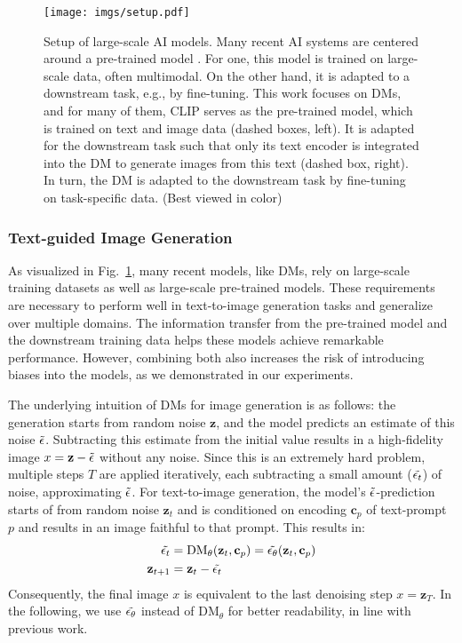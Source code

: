 \documentclass{article}%
\begin{document}
\begin{figure}[t]
    \centering
    \texttt{[image: imgs/setup.pdf]}
    \caption{Setup of large-scale AI models. Many recent AI systems are centered around a pre-trained model \cite{Bommasani21foundationmodels}. For one, this model is trained on large-scale data, often multimodal. On the other hand, it is adapted to a downstream task, e.g., by fine-tuning. This work focuses on DMs, and for many of them, CLIP serves as the pre-trained model, which is trained on text and image data (dashed boxes, left). It is adapted for the downstream task such that only its text encoder is integrated into the DM to generate images from this text (dashed box, right). In turn, the DM is adapted to the downstream task by fine-tuning on task-specific data. (Best viewed in color)}
    \label{fig:pipe}
\end{figure}

\subsubsection*{Text-guided Image Generation}\label{sec:diffusion}
As visualized in Fig.~\ref{fig:pipe}, 
many recent models, like DMs, rely on large-scale training datasets as well as large-scale pre-trained models. These requirements are necessary to perform well in text-to-image generation tasks and generalize over multiple domains. The information transfer from the pre-trained model and the downstream training data helps these models achieve remarkable performance. However, combining both also increases the risk of introducing biases into the models, as we demonstrated in our experiments. %

The underlying intuition of DMs for image generation is as follows: 
the generation starts from random noise $\mathbf{z}$, and the model predicts an estimate of this noise $\Tilde{\epsilon}$. Subtracting this estimate from the initial value results in a high-fidelity image $x = \mathbf{z} - \Tilde{\epsilon}$ without any noise. 
Since this is an extremely hard problem, multiple steps $T$ are applied iteratively, each subtracting a small amount ($\Tilde{\epsilon_t}$) of noise, approximating $\Tilde{\epsilon}$. For text-to-image generation, the model's $\Tilde{\epsilon}$-prediction starts of from random noise $\mathbf{z}_t$ and is conditioned on encoding $\mathbf{c}_p$ of text-prompt $p$ and results in an image faithful to that prompt.
This results in:
\begin{align}\label{eqn:dm_eqn}
    \Tilde{\epsilon_t} &= \text{DM}_{\theta}(\mathbf{z}_t, \mathbf{c}_p) = \Tilde{\epsilon_\theta}(\mathbf{z}_t, \mathbf{c}_p) \\
    \mathbf{z}_{t+1} &= \mathbf{z}_t - \Tilde{\epsilon_t} 
\end{align}
Consequently, the final image $x$ is equivalent to the last denoising step $x = \mathbf{z}_T$.
In the following, we use $\Tilde{\epsilon_\theta}$ instead of DM$_\theta$ for better readability, in line with previous work.
\end{document}

